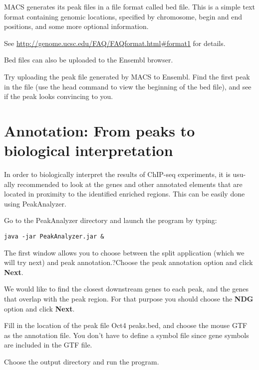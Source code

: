 \begin{note}
MACS generates its peak files in a file format called bed file. This is a simple text format containing genomic locations, specified by chromosome, begin and end positions, and some more optional information.

See \url{http://genome.ucsc.edu/FAQ/FAQformat.html#format1} for details. 

Bed files can also be uploaded to the Ensembl browser. 
\end{note}

\begin{advanced}
Try uploading the peak file generated by MACS to Ensembl. Find the first peak in the file (use the head command to view the beginning of the bed file), and see if the peak looks convincing to you. 
\end{advanced}


\section{Annotation: From peaks to biological interpretation}

\begin{information}
In order to biologically interpret the results of ChIP-seq experiments, it is usu- ally recommended to look at the genes and other annotated elements that are located in proximity to the identified enriched regions. This can be easily done using PeakAnalyzer.
\end{information}

\begin{steps}
Go to the PeakAnalyzer directory and launch the program by typing:
\begin{lstlisting}
java -jar PeakAnalyzer.jar &
\end{lstlisting}

The first window allows you to choose between the split application (which we will try next) and peak annotation.?Choose the peak annotation option and click \textbf{Next}. 

We would like to find the closest downstream genes to each peak, and the genes that overlap with the peak region. For that purpose you should choose the \textbf{NDG} option and click \textbf{Next}. 

Fill in the location of the peak file Oct4 peaks.bed, and choose the mouse GTF as the annotation file. You don't have to define a symbol file since gene symbols are included in the GTF file. 

Choose the output directory and run the program. 
\end{steps}

